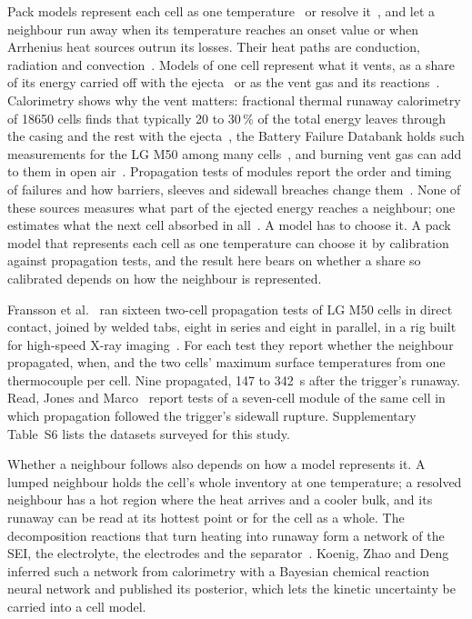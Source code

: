 \documentclass[preprint,12pt]{elsarticle}
\begin{document}
Pack models represent each cell as one temperature~\cite{feng2015propagation} or resolve it~\cite{mishra2021multimode,hoelle2023simulation}, and let a neighbour run away when its temperature reaches an onset value or when Arrhenius heat sources outrun its losses. Their heat paths are conduction, radiation and convection~\cite{mishra2021multimode}. Models of one cell represent what it vents, as a share of its energy carried off with the ejecta~\cite{coman2017modelling} or as the vent gas and its reactions~\cite{kim2021venting}. Calorimetry shows why the vent matters: fractional thermal runaway calorimetry of 18650 cells finds that typically 20 to 30\,\% of the total energy leaves through the casing and the rest with the ejecta~\cite{walker2019decoupling}, the Battery Failure Databank holds such measurements for the LG M50 among many cells~\cite{finegan2024databank}, and burning vent gas can add to them in open air~\cite{vendra2022numerical,chen2020experimental}. Propagation tests of modules report the order and timing of failures and how barriers, sleeves and sidewall breaches change them~\cite{lamb2015failure,said2019cascading,torrescastro2020passive,read2024barrier,schoberl2024propagation,allen2025sleeves}. None of these sources measures what part of the ejected energy reaches a neighbour; one estimates what the next cell absorbed in all~\cite{torrescastro2020passive}. A model has to choose it. A pack model that represents each cell as one temperature can choose it by calibration against propagation tests, and the result here bears on whether a share so calibrated depends on how the neighbour is represented.

Fransson et al.~\cite{fransson2024exploring} ran sixteen two-cell propagation tests of LG M50 cells in direct contact, joined by welded tabs, eight in series and eight in parallel, in a rig built for high-speed X-ray imaging~\cite{pfaff2023insitu}. For each test they report whether the neighbour propagated, when, and the two cells' maximum surface temperatures from one thermocouple per cell. Nine propagated, 147 to 342~s after the trigger's runaway. Read, Jones and Marco~\cite{read2024sidewall} report tests of a seven-cell module of the same cell in which propagation followed the trigger's sidewall rupture. Supplementary Table~S6 lists the datasets surveyed for this study.

Whether a neighbour follows also depends on how a model represents it. A lumped neighbour holds the cell's whole inventory at one temperature; a resolved neighbour has a hot region where the heat arrives and a cooler bulk, and its runaway can be read at its hottest point or for the cell as a whole. The decomposition reactions that turn heating into runaway form a network of the SEI, the electrolyte, the electrodes and the separator~\cite{feng2018mechanism}. Koenig, Zhao and Deng~\cite{koenig2025uncertainty} inferred such a network from calorimetry with a Bayesian chemical reaction neural network and published its posterior, which lets the kinetic uncertainty be carried into a cell model.
\end{document}

